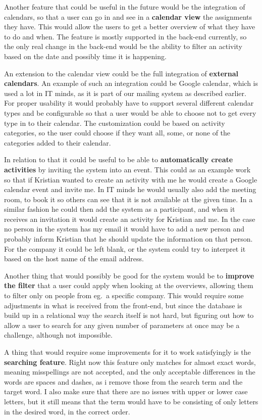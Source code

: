 Another feature that could be useful in the future would be the integration of
calendars, so that a user can go in and see in a \textbf{calendar view} the assignments
they have. This would allow the users to get a better overview of what they have
to do and when. The feature is mostly supported in the back-end currently, so
the only real change in the back-end would be the ability to filter an activity
based on the date and possibly time it is happening.

An extension to the calendar view could be the full integration of \textbf{external
calendars}. An example of such an integration could be Google calendar, which is
used a lot in IT minds, as it is part of our mailing system as described
earlier. For proper usability it would probably have to support several
different calendar types and be configurable so that a user would be able to
choose not to get every type in to their calendar. The customization could be
based on activity categories, so the user could choose if they want all, some,
or none of the categories added to their calendar.

In relation to that it could be useful to be able to \textbf{automatically create
activities} by inviting the system into an event. This could as an example work
so that if Kristian wanted to create an activity with me he would create a
Google calendar event and invite me. In IT minds he would usually also add the
meeting room, to book it so others can see that it is not available at the given
time. In a similar fashion he could then add the system as a participant, and
when it receives an invitation it would create an activity for Kristian and me.
In the case no person in the system has my email it would have to add a new
person and probably inform Kristian that he should update the information on
that person. For the company it could be left blank, or the system could try to
interpret it based on the host name of the email address.

Another thing that would possibly be good for the system would  be to \textbf{improve
the filter} that a user could apply when looking at the overviews, allowing them
to filter only on people from eg.\ a specific company. This would require some
adjustments in what is received from the front-end, but since the database is
build up in a relational way the search itself is not hard, but figuring out how
to allow a user to search for any given number of parameters at once may be a
challenge, although not impossible.

A thing that would require some improvements for it to work satisfyingly is the
\textbf{searching feature}. Right now this feature only matches for almost exact words,
meaning misspellings are not accepted, and the only acceptable differences in
the words are spaces and dashes, as i remove those from the search term and the
target word. I also make sure that there are no issues with upper or lower case
letters, but it still means that the term would have to be consisting of only
letters in the desired word, in the correct order.

